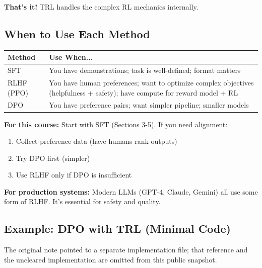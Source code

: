 \documentclass{article}
\begin{document}

\textbf{That's it!} TRL handles the complex RL mechanics internally.

\subsection{When to Use Each Method}

\begin{center}
\begin{tabular}{|l|p{10cm}|}
\hline
\textbf{Method} & \textbf{Use When...} \\
\hline
SFT & You have demonstrations; task is well-defined; format matters \\
\hline
RLHF (PPO) & You have human preferences; want to optimize complex objectives (helpfulness + safety); have compute for reward model + RL \\
\hline
DPO & You have preference pairs; want simpler pipeline; smaller models \\
\hline
\end{tabular}
\end{center}

\begin{tcolorbox}[colback=green!5!white, colframe=green!50!black, title=Practical Recommendation]
\textbf{For this course:} Start with SFT (Sections 3-5). If you need alignment:
\begin{enumerate}
\item Collect preference data (have humans rank outputs)
\item Try DPO first (simpler)
\item Use RLHF only if DPO is insufficient
\end{enumerate}

\textbf{For production systems:} Modern LLMs (GPT-4, Claude, Gemini) all use some form of RLHF. It's essential for safety and quality.
\end{tcolorbox}

\subsection{Example: DPO with TRL (Minimal Code)}

The original note pointed to a separate implementation file; that reference and the
uncleared implementation are omitted from this public snapshot.

\end{document}
